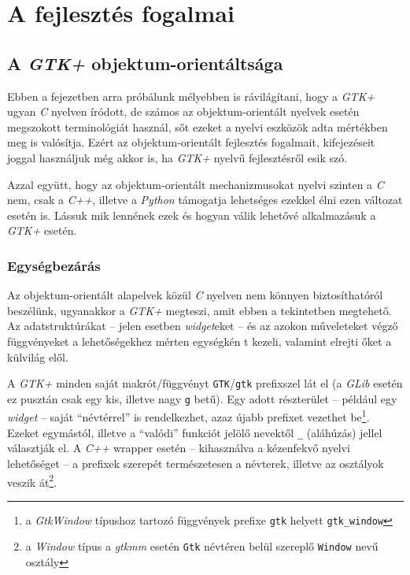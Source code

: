 \section{A fejlesztés fogalmai}

\subsection{A \textit{GTK+} objektum-orientáltsága}

Ebben a fejezetben arra próbálunk mélyebben is rávilágítani, hogy a \textit{GTK+} ugyan \textit{C} nyelven íródott, de számos az objektum-orientált nyelvek esetén megszokott terminológiát használ, sőt ezeket a nyelvi eszközök adta mértékben meg is valósítja. Ezért az objektum-orientált fejlesztés fogalmait, kifejezéseit joggal használjuk még akkor is, ha \textit{GTK+} nyelvű fejlesztésről esik szó.

Azzal együtt, hogy az objektum-orientált mechanizmusokat nyelvi szinten a \textit{C} nem, csak a \textit{C++}, illetve a \textit{Python} támogatja lehetséges ezekkel élni ezen változat esetén is. Lássuk mik lennének ezek és hogyan válik lehetővé alkalmazásuk a \textit{GTK+} esetén.

\subsubsection{Egységbezárás}

Az objektum-orientált alapelvek közül \textit{C} nyelven nem könnyen biztosíthatóról beszélünk, ugyanakkor a \textit{GTK+} megteszi, amit ebben a tekintetben megtehető. Az adatstruktúrákat -- jelen esetben \textit{widget}eket -- és az azokon műveleteket végző függvényeket a lehetőségekhez mérten egységkén t kezeli, valamint elrejti őket a külvilág elől.

A \textit{GTK+} minden saját makrót/függvényt \texttt{GTK}/\texttt{gtk} prefixszel lát el (a \textit{GLib} esetén ez pusztán csak egy kis, illetve nagy \texttt{g} betű). Egy adott részterület -- például egy \textit{widget} -- saját ``névtérrel'' is rendelkezhet, azaz újabb prefixet vezethet be\footnote{a \textit{GtkWindow} típushoz tartozó függvények prefixe \texttt{gtk} helyett \texttt{gtk\_window}}. Ezeket egymástól, illetve a ``valódi'' funkciót jelölő nevektől \texttt{\_} (aláhúzás) jellel választják el. A \textit{C++} wrapper esetén -- kihasználva a kézenfekvő nyelvi lehetőséget -- a prefixek szerepét természetesen a névterek, illetve az osztályok veszik át\footnote{a \textit{Window} típus a \textit{gtkmm} esetén \texttt{Gtk} névtéren belül szereplő \texttt{Window} nevű osztály}.


